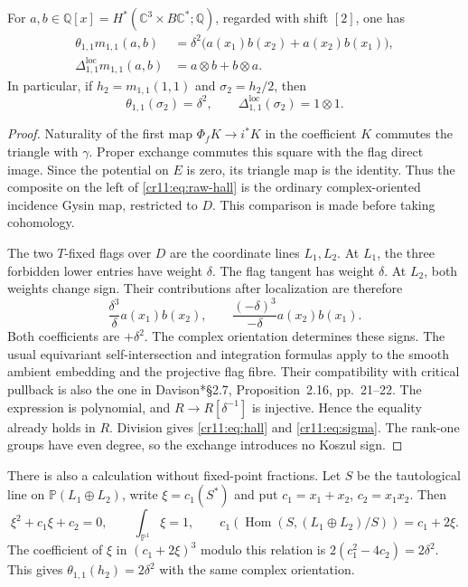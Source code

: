 \begin{theorem}
\label{cr11:thm:hall}
For $a,b\in\mathbb Q[x]=H^*(\mathbb C^3\times B\mathbb C^*;\mathbb Q)$,
regarded with shift $[2]$, one has
\begin{align}
 \theta_{1,1}m_{1,1}(a,b)
   &=\delta^2\bigl(a(x_1)b(x_2)+a(x_2)b(x_1)\bigr),
       \label{cr11:eq:raw-hall}\\
 \Delta_{1,1}^{\mathrm{loc}}m_{1,1}(a,b)
   &=a\otimes b+b\otimes a.
       \label{cr11:eq:hall}
\end{align}
In particular, if $h_2=m_{1,1}(1,1)$ and $\sigma_2=h_2/2$, then
\begin{equation}
 \theta_{1,1}(\sigma_2)=\delta^2,\qquad
 \Delta_{1,1}^{\mathrm{loc}}(\sigma_2)=1\otimes1.
 \label{cr11:eq:sigma}
\end{equation}
\end{theorem}

\begin{proof}
Naturality of the first map $\Phi_fK\to i^*K$ in the coefficient $K$
commutes the triangle with $\gamma$.
Proper exchange commutes this square with the flag direct image.
Since the potential on $E$ is zero, its triangle map is the identity.
Thus the composite on the left of \eqref{cr11:eq:raw-hall} is the
ordinary complex-oriented incidence Gysin map, restricted to $D$.
This comparison is made before taking cohomology.

The two $T$-fixed flags over $D$ are the coordinate lines $L_1,L_2$.
At $L_1$, the three forbidden lower entries have weight $\delta$.
The flag tangent has weight $\delta$.
At $L_2$, both weights change sign.
Their contributions after localization are therefore
\[
 \frac{\delta^3}{\delta}a(x_1)b(x_2),\qquad
 \frac{(-\delta)^3}{-\delta}a(x_2)b(x_1).
\]
Both coefficients are $+\delta^2$.
The complex orientation determines these signs.
The usual equivariant self-intersection and integration formulas apply
to the smooth ambient embedding and the projective flag fibre.
Their compatibility with critical pullback is also the one in
Davison\cite{cr11Davison}*{\S2.7, Proposition~2.16, pp.~21--22}.
The expression is polynomial, and $R\to R[\delta^{-1}]$ is injective.
Hence the equality already holds in $R$.
Division gives \eqref{cr11:eq:hall} and \eqref{cr11:eq:sigma}.
The rank-one groups have even degree, so the exchange introduces
no Koszul sign.
\end{proof}

There is also a calculation without fixed-point fractions.
Let $S$ be the tautological line on $\mathbb P(L_1\oplus L_2)$,
write $\xi=c_1(S^*)$ and put $c_1=x_1+x_2$, $c_2=x_1x_2$.
Then
\[
 \xi^2+c_1\xi+c_2=0,\qquad
 \int_{\mathbb P^1}\xi=1,\qquad
 c_1(\operatorname{Hom}(S,(L_1\oplus L_2)/S))=c_1+2\xi.
\]
The coefficient of $\xi$ in $(c_1+2\xi)^3$ modulo this relation is
$2(c_1^2-4c_2)=2\delta^2$.
This gives $\theta_{1,1}(h_2)=2\delta^2$ with the same complex orientation.

